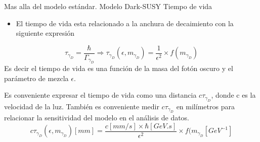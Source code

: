 \begin{frame}{Mas alla del modelo est\'andar. Modelo Dark-SUSY}
Tiempo de vida\\
\begin{itemize}
\item El tiempo de vida esta relacionado a la anchura de decaimiento con la siguiente expresi\'on
\end{itemize}
\begin{equation}
\tau_{\gamma_{D}} = \frac{\hbar}{\Gamma_{\gamma_{D}}} \Rightarrow 
\tau_{\gamma_{D}}(\epsilon, m_{\gamma_{D}}) = \frac{1}{\epsilon^{2}}\times f(m_{\gamma_{D}})
\end{equation}
Es decir el tiempo de vida es una funci\'on de la masa del fot\'on oscuro y el par\'ametro de mezcla $\epsilon$. 

Es conveniente expresar el tiempo de vida como una distancia $c\tau_{\gamma_{D}}$, donde c es la velocidad de la luz. Tambi\'en es conveniente medir $c\tau_{\gamma_{D}}$ en milímetros para relacionar la sensitividad del modelo en el an\'alisis de datos. 
\begin{equation}
c\tau_{\gamma_{D}}(\epsilon,m_{\gamma_{D}})[mm] = \frac{c[mm/s]\times \hbar[GeV.s]}{\epsilon^{2}} \times f(m_{\gamma_{D}}[GeV^{-1}]
\end{equation}
\end{frame}


